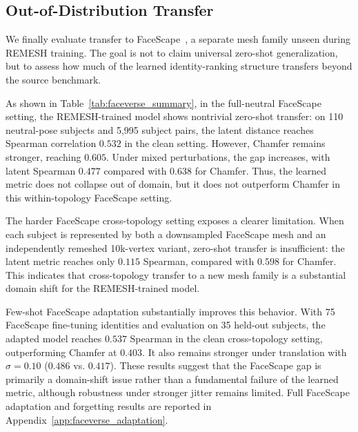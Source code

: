 \documentclass{article}
\begin{document}
\subsection{Out-of-Distribution Transfer}
\label{sec:ood_transfer}
We finally evaluate transfer to FaceScape~\cite{facescape}, a separate mesh family unseen during REMESH training. The goal is not to claim universal zero-shot generalization, but to assess how much of the learned identity-ranking structure transfers beyond the source benchmark.

As shown in Table~\ref{tab:faceverse_summary}, in the full-neutral FaceScape setting, the REMESH-trained model shows nontrivial zero-shot transfer: on 110 neutral-pose subjects and 5,995 subject pairs, the latent distance reaches Spearman correlation $0.532$ in the clean setting. However, Chamfer remains stronger, reaching $0.605$. Under mixed perturbations, the gap increases, with latent Spearman $0.477$ compared with $0.638$ for Chamfer. Thus, the learned metric does not collapse out of domain, but it does not outperform Chamfer in this within-topology FaceScape setting.

The harder FaceScape cross-topology setting exposes a clearer limitation. When each subject is represented by both a downsampled FaceScape mesh and an independently remeshed 10k-vertex variant, zero-shot transfer is insufficient: the latent metric reaches only $0.115$ Spearman, compared with $0.598$ for Chamfer. This indicates that cross-topology transfer to a new mesh family is a substantial domain shift for the REMESH-trained model.

Few-shot FaceScape adaptation substantially improves this behavior. With 75 FaceScape fine-tuning identities and evaluation on 35 held-out subjects, the adapted model reaches $0.537$ Spearman in the clean cross-topology setting, outperforming Chamfer at $0.403$. It also remains stronger under translation with $\sigma=0.10$ ($0.486$ vs. $0.417$). These results suggest that the FaceScape gap is primarily a domain-shift issue rather than a fundamental failure of the learned metric, although robustness under stronger jitter remains limited. Full FaceScape adaptation and forgetting results are reported in
Appendix~\ref{app:faceverse_adaptation}.
\end{document}
